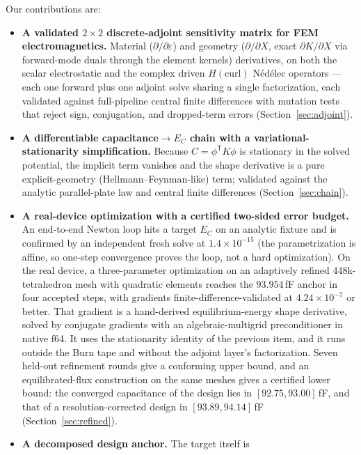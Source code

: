 \documentclass{anvil-paper}
\begin{document}
Our contributions are:
\begin{itemize}
  \item \textbf{A validated $2\times 2$ discrete-adjoint sensitivity
    matrix for FEM electromagnetics.} Material
    ($\partial/\partial\varepsilon$) and geometry ($\partial/\partial X$,
    exact $\partial K/\partial X$ via forward-mode duals through the
    element kernels) derivatives, on both the scalar electrostatic and
    the complex driven $H(\mathrm{curl})$ N\'ed\'elec operators --- each
    one forward plus one adjoint solve sharing a single factorization,
    each validated against full-pipeline central finite differences with
    mutation tests that reject sign, conjugation, and dropped-term errors
    (Section~\ref{sec:adjoint}).
  \item \textbf{A differentiable capacitance$\to E_C$ chain with a
    variational-stationarity simplification.} Because $C =
    \phi^{\mathsf{T}} K\phi$ is stationary in the solved potential, the
    implicit term vanishes and the shape derivative is a pure
    explicit-geometry (Hellmann--Feynman-like) term; validated against
    the analytic parallel-plate law and central finite differences
    (Section~\ref{sec:chain}).
  \item \textbf{A real-device optimization with a certified two-sided
    error budget.} An end-to-end Newton loop hits a target $E_C$ on an
    analytic fixture and is confirmed by an independent fresh solve at
    $1.4\times 10^{-15}$ (the parametrization is affine, so one-step
    convergence proves the loop, not a hard optimization). On the real
    device, a three-parameter optimization on an adaptively refined
    448k-tetrahedron mesh with quadratic elements reaches the
    $93.954$\,fF anchor in four accepted steps, with gradients
    finite-difference-validated at $4.24\times10^{-7}$ or better. That
    gradient is a hand-derived equilibrium-energy shape derivative,
    solved by conjugate gradients with an algebraic-multigrid
    preconditioner in native f64. It uses the stationarity identity of
    the previous item, and it runs outside the Burn tape and without the
    adjoint layer's factorization. Seven held-out refinement rounds give a
    conforming upper bound, and an equilibrated-flux construction on the
    same meshes gives a certified lower bound: the converged capacitance
    of the design lies in $[92.75, 93.00]$\,fF, and that of a
    resolution-corrected design in $[93.89, 94.14]$\,fF
    (Section~\ref{sec:refined}).
  \item \textbf{A decomposed design anchor.} The target itself is

\end{itemize}
\end{document}
